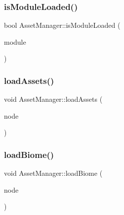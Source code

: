 \mbox{\label{class_asset_manager_a2ef6d83cab64a6f6e57dd9b19c845318}} 
\subsubsection{\texorpdfstring{is\+Module\+Loaded()}{isModuleLoaded()}}
{\footnotesize\ttfamily bool Asset\+Manager\+::is\+Module\+Loaded (\begin{DoxyParamCaption}\item[{const char $\ast$}]{module }\end{DoxyParamCaption})}

\mbox{\label{class_asset_manager_ab28406baefcbab2de39fa37a6b6e058f}} 
\subsubsection{\texorpdfstring{load\+Assets()}{loadAssets()}}
{\footnotesize\ttfamily void Asset\+Manager\+::load\+Assets (\begin{DoxyParamCaption}\item[{\hyperlink{class_asset_manager_1_1_node}{Node} $\ast$}]{node }\end{DoxyParamCaption})\hspace{0.3cm}{\ttfamily [private]}}

\mbox{\label{class_asset_manager_a8fc5263cd5007fe968a1d040f9b7c331}} 
\subsubsection{\texorpdfstring{load\+Biome()}{loadBiome()}}
{\footnotesize\ttfamily void Asset\+Manager\+::load\+Biome (\begin{DoxyParamCaption}\item[{\hyperlink{class_asset_manager_1_1_node}{Asset\+Manager\+::\+Node} $\ast$}]{node }\end{DoxyParamCaption})\hspace{0.3cm}{\ttfamily [private]}}

